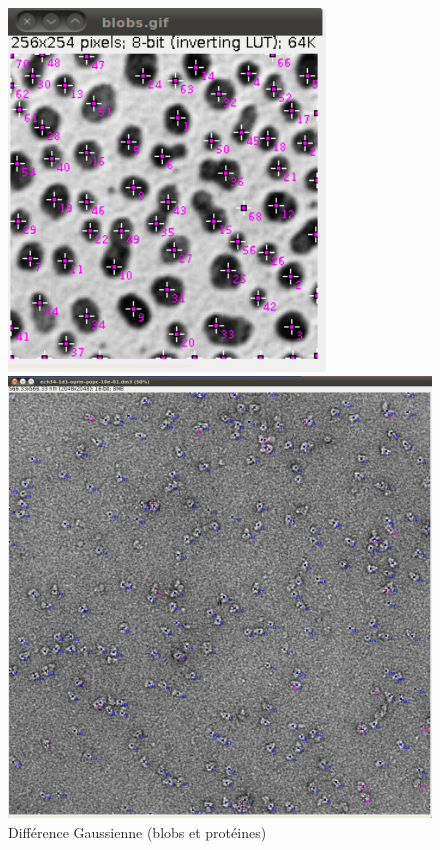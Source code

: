 \begin{figure}[!ht]
\begin{center}
 \begin{minipage}{.450\linewidth}
  \includegraphics[width=0.75\textwidth]{blobsDog.png}  
 \end{minipage} \hfill
\begin{minipage}{.450\linewidth}
  \includegraphics[width=1\textwidth]{protDog.png}   
 \end{minipage} \hfill
\caption{Différence Gaussienne (blobs et protéines)}
\end{center}
\end{figure}


